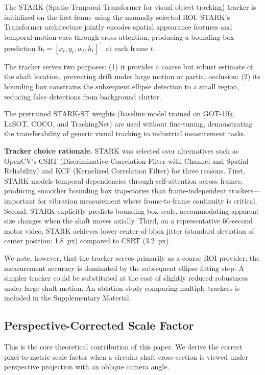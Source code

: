 \documentclass[journal]{IEEEtran}
\begin{document}
The STARK (Spatio-Temporal Transformer for visual object tracking) tracker
is initialized on the first frame using the manually selected ROI. STARK's
Transformer architecture jointly encodes spatial appearance features and
temporal motion cues through cross-attention, producing a bounding box
prediction $\mathbf{b}_t = [x_t, y_t, w_t, h_t]^{\top}$ at each frame $t$.

The tracker serves two purposes: (1) it provides a coarse but robust estimate
of the shaft location, preventing drift under large motion or partial occlusion;
(2) its bounding box constrains the subsequent ellipse detection to a small
region, reducing false detections from background clutter.

The pretrained STARK-ST weights (baseline model trained on GOT-10k, LaSOT,
COCO, and TrackingNet) are used without fine-tuning, demonstrating the
transferability of generic visual tracking to industrial measurement tasks.

\noindent \textbf{Tracker choice rationale.} STARK was selected over
alternatives such as OpenCV's CSRT (Discriminative Correlation Filter with
Channel and Spatial Reliability) and KCF (Kernelized Correlation Filter) for
three reasons. First, STARK models temporal dependencies through self-attention
across frames, producing smoother bounding box trajectories than frame-independent
trackers---important for vibration measurement where frame-to-frame continuity
is critical. Second, STARK explicitly predicts bounding box scale, accommodating
apparent size changes when the shaft moves axially. Third, on a representative
60-second motor video, STARK achieves lower center-of-bbox jitter (standard
deviation of center position: 1.8~px) compared to CSRT (3.2~px).

We note, however, that the tracker serves primarily as a coarse ROI provider;
the measurement accuracy is dominated by the subsequent ellipse fitting step.
A simpler tracker could be substituted at the cost of slightly reduced
robustness under large shaft motion. An ablation study comparing multiple
trackers is included in the Supplementary Material.

\subsection{Perspective-Corrected Scale Factor}
\label{sec:scale}

This is the core theoretical contribution of this paper. We derive the correct
pixel-to-metric scale factor when a circular shaft cross-section is viewed under
perspective projection with an oblique camera angle.
\end{document}
